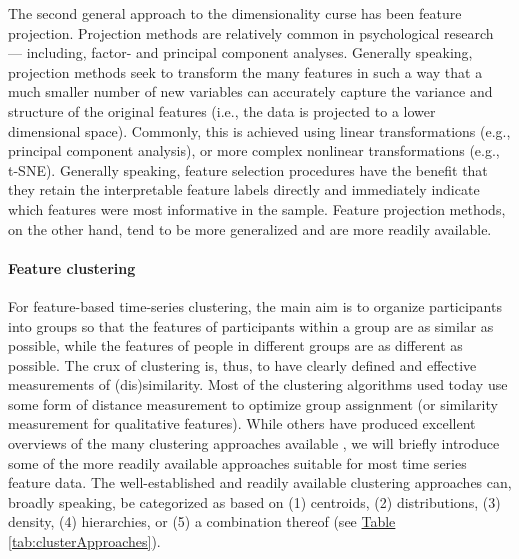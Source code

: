 \documentclass[man, 12pt, a4paper, mask]{apa7}
\theoremstyle{break}
\theoremstyle{plain}
\newcommand{\tblref}[2][]{\hyperref[#2]{Table \ref*{#2}#1}}
\begin{document}
The second general approach to the dimensionality curse has been feature projection. Projection methods are relatively common in psychological research --- including, factor- and principal component analyses. Generally speaking, projection methods seek to transform the many features in such a way that a much smaller number of new variables can accurately capture the variance and structure of the original features (i.e., the data is projected to a lower dimensional space). Commonly, this is achieved using linear transformations (e.g., principal component analysis), or more complex nonlinear transformations (e.g., t-SNE). Generally speaking, feature selection procedures have the benefit that they retain the interpretable feature labels directly and immediately indicate which features were most informative in the sample. Feature projection methods, on the other hand, tend to be more generalized and are more readily available.



\paragraph{Feature clustering}
For feature-based time-series clustering, the main aim is to organize participants into groups so that the features of participants within a group are as similar as possible, while the features of people in different groups are as different as possible. The crux of clustering is, thus, to have clearly defined and effective measurements of (dis)similarity. Most of the clustering algorithms used today use some form of distance measurement to optimize group assignment (or similarity measurement for qualitative features). While others have produced excellent overviews of the many clustering approaches available \citep[e.g.,][]{xu2015}, we will briefly introduce some of the more readily available approaches suitable for most time series feature data. The well-established and readily available clustering approaches can, broadly speaking, be categorized as based on (1) centroids, (2) distributions, (3) density, (4) hierarchies, or (5) a combination thereof (see \tblref{tab:clusterApproaches}). 
\end{document}
